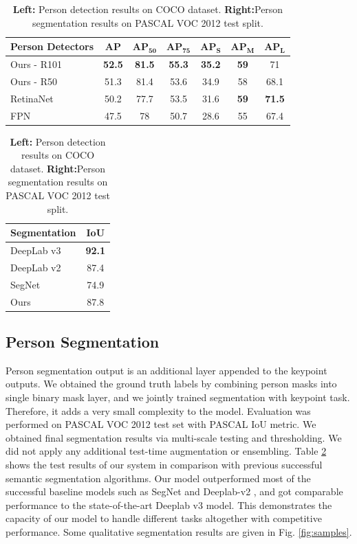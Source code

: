 \documentclass[runningheads]{llncs}
\begin{document}
\begin{table}[h]
\begin{center}
\caption{\textbf{Left:} Person detection results on COCO dataset. \textbf{Right:}Person segmentation results on PASCAL VOC 2012 test split.}
\label{table:person}
\begin{tabular}{l||cccccc}
\hline
\textbf{Person Detectors} & $\mathbf{AP}$ & $\mathbf{AP_{50}}$ & $\mathbf{AP_{75}}$ & $\mathbf{AP_{S}}$ & $\mathbf{AP_{M}}$ & $\mathbf{AP_{L}}$ \\ \hline
Ours - R101 & \textbf{52.5} & \textbf{81.5} & \textbf{55.3} & \textbf{35.2} & \textbf{59} & 71 \\
Ours - R50 & 51.3 & 81.4 & 53.6 & 34.9 & 58 & 68.1 \\
RetinaNet \cite{Lin2017} & 50.2 & 77.7 & 53.5 & 31.6 & \textbf{59} & \textbf{71.5} \\
FPN \cite{Lina} & 47.5 & 78 & 50.7 & 28.6 & 55 & 67.4 \\ \hline
\end{tabular}
\quad
\begin{tabular}{l||c}
\hline
\textbf{Segmentation} & \textbf{IoU} \\ \hline
DeepLab v3 \cite{Chen} & \textbf{92.1} \\ 
DeepLab v2 \cite{Chen2016} & 87.4 \\ 
SegNet \cite{kendall2015bayesian} & 74.9 \\ \hline
Ours & 87.8 \\ \hline
\end{tabular}
\end{center}
\end{table}
\subsection{Person Segmentation}
Person segmentation output is an additional layer appended to the keypoint outputs. We obtained the ground truth labels by combining person masks into single binary mask layer, and we jointly trained segmentation with keypoint task. Therefore, it adds a very small complexity to the model. Evaluation was performed on PASCAL VOC 2012 test set with PASCAL IoU metric. We obtained final segmentation results via multi-scale testing and thresholding. We did not apply any additional test-time augmentation or ensembling. Table \ref{table:person} shows the test results of our system in comparison with previous successful semantic segmentation algorithms. Our model outperformed most of the successful baseline models such as SegNet \cite{kendall2015bayesian} and Deeplab-v2 \cite{Chen2016}, and got comparable performance to the state-of-the-art Deeplab v3 \cite{Chen} model. This demonstrates the capacity of our model to handle different tasks altogether with competitive performance. Some qualitative segmentation results are given in Fig. \ref{fig:samples}.
\end{document}
